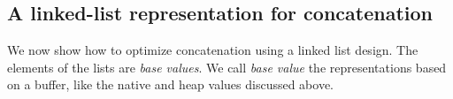 \documentclass[twoside,11pt,a4paper]{article}
\begin{document}
\subsection{A linked-list representation for concatenation}


We now show how to optimize concatenation using a linked list design. The elements of the lists are \textit{base values}. We call \textit{base value} the representations based on a buffer, like the native and heap values discussed above.
\end{document}
